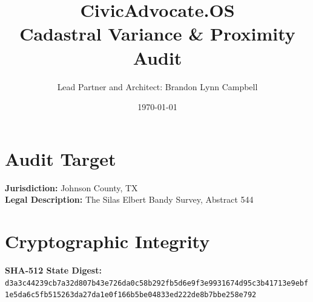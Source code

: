 \documentclass{article}
\title{CivicAdvocate.OS \\ Cadastral Variance \& Proximity Audit}
\author{Lead Partner and Architect: Brandon Lynn Campbell}
\date{\today}
\begin{document}
\maketitle

\section*{Audit Target}
\textbf{Jurisdiction:} Johnson County, TX\\
\textbf{Legal Description:} The Silas Elbert Bandy Survey, Abstract 544

\section*{Cryptographic Integrity}
\textbf{SHA-512 State Digest:}\\
\texttt{d3a3c44239cb7a32d807b43e726da0c58b292fb5d6e9f3e9931674d95c3b41713e9ebf1e5da6c5fb515263da27da1e0f166b5be04833ed222de8b7bbe258e792}
\end{document}
